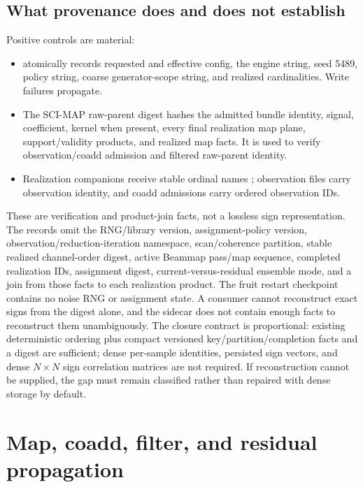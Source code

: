 \documentclass[10pt]{article}
\begin{document}
\subsection{What provenance does and does not establish}

Positive controls are material:

\begin{itemize}[leftmargin=*]
  \item {} atomically records requested and
        effective config, the engine string, seed 5489, policy string, coarse
        generator-scope string, and realized cardinalities.  Write failures
        propagate.
  \item The SCI-MAP raw-parent digest hashes the admitted bundle identity,
        signal, coefficient, kernel when present, every final realization
        map plane, support/validity products, and realized map facts.  It is
        used to verify observation/coadd admission and filtered raw-parent
        identity.
  \item Realization companions receive stable ordinal names
        ; observation files carry observation
        identity, and coadd admissions carry ordered observation IDs.
\end{itemize}

These are verification and product-join facts, not a lossless sign
representation.  The records omit the RNG/library version, assignment-policy
version, observation/reduction-iteration namespace, scan/coherence partition,
stable realized channel-order digest, active Beammap pass/map sequence,
completed realization IDs, assignment digest, current-versus-residual
ensemble mode, and a join from those facts to each realization product.
The fruit restart checkpoint contains no noise RNG or assignment state.  A
consumer cannot reconstruct exact signs from the digest alone, and the sidecar
does not contain enough facts to reconstruct them unambiguously.  The closure
contract is proportional: existing deterministic ordering plus compact
versioned key/partition/completion facts and a digest are sufficient; dense
per-sample identities, persisted sign vectors, and dense $N\times N$ sign
correlation matrices are not required.  If reconstruction cannot be supplied,
the gap must remain classified rather than repaired with dense storage by
default.

\section{Map, coadd, filter, and residual propagation}
\label{sec:operators}
\end{document}
